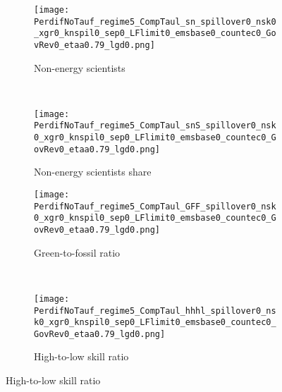 \begin{figure}[h!!]
\begin{subfigure}[]{0.4\textwidth}
\caption{{ Non-energy scientists }}
\texttt{[image: PerdifNoTauf\_regime5\_CompTaul\_sn\_spillover0\_nsk0\_xgr0\_knspil0\_sep0\_LFlimit0\_emsbase0\_countec0\_GovRev0\_etaa0.79\_lgd0.png]}
\end{subfigure}	
\begin{minipage}[]{0.1\textwidth}
\
\end{minipage}
\begin{subfigure}[]{0.4\textwidth}
	\caption{{ Non-energy scientists share}}
	\texttt{[image: PerdifNoTauf\_regime5\_CompTaul\_snS\_spillover0\_nsk0\_xgr0\_knspil0\_sep0\_LFlimit0\_emsbase0\_countec0\_GovRev0\_etaa0.79\_lgd0.png]}
\end{subfigure}

\begin{subfigure}[]{0.4\textwidth}
\caption{{ Green-to-fossil ratio }}
\texttt{[image: PerdifNoTauf\_regime5\_CompTaul\_GFF\_spillover0\_nsk0\_xgr0\_knspil0\_sep0\_LFlimit0\_emsbase0\_countec0\_GovRev0\_etaa0.79\_lgd0.png]}
\end{subfigure}
\begin{minipage}[]{0.1\textwidth}
	\
\end{minipage}
\begin{subfigure}[]{0.4\textwidth}
\caption{{ High-to-low skill ratio }}
\texttt{[image: PerdifNoTauf\_regime5\_CompTaul\_hhhl\_spillover0\_nsk0\_xgr0\_knspil0\_sep0\_LFlimit0\_emsbase0\_countec0\_GovRev0\_etaa0.79\_lgd0.png]}
\end{subfigure}
\end{figure}

